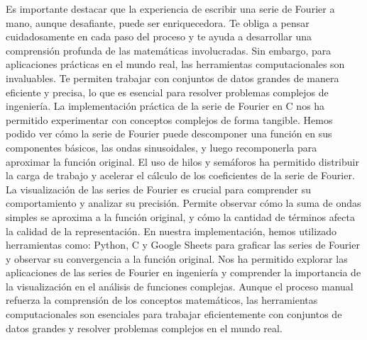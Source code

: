 Es importante destacar que la experiencia de escribir una serie de Fourier a mano, aunque desafiante, puede ser enriquecedora. Te obliga a pensar cuidadosamente en cada paso del proceso y te ayuda a desarrollar una comprensión profunda de las matemáticas involucradas. Sin embargo, para aplicaciones prácticas en el mundo real, las herramientas computacionales son invaluables. Te permiten trabajar con conjuntos de datos grandes de manera eficiente y precisa, lo que es esencial para resolver problemas complejos de ingeniería. La implementación práctica de la serie de Fourier en C nos ha permitido experimentar con conceptos complejos de forma tangible. Hemos podido ver cómo la serie de Fourier puede descomponer una función en sus componentes básicos, las ondas sinusoidales, y luego recomponerla para aproximar la función original. El uso de hilos y semáforos ha permitido distribuir la carga de trabajo y acelerar el cálculo de los coeficientes de la serie de Fourier. La visualización de las series de Fourier es crucial para comprender su comportamiento y analizar su precisión. Permite observar cómo la suma de ondas simples se aproxima a la función original, y cómo la cantidad de términos afecta la calidad de la representación. En nuestra implementación, hemos utilizado herramientas como: Python, C y Google Sheets para graficar las series de Fourier y observar su convergencia a la función original. Nos ha permitido explorar las aplicaciones de las series de Fourier en ingeniería y comprender la importancia de la visualización en el análisis de funciones complejas. Aunque el proceso manual refuerza la comprensión de los conceptos matemáticos, las herramientas computacionales son esenciales para trabajar eficientemente con conjuntos de datos grandes y resolver problemas complejos en el mundo real.

